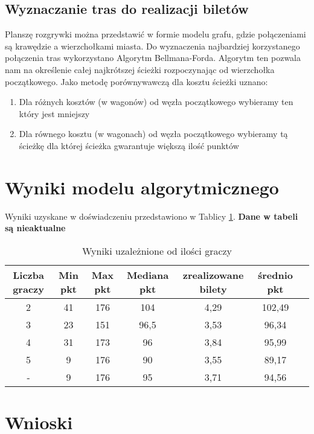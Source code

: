 \documentclass[12pt, oneside]{report}
\begin{document}
\subsection{Wyznaczanie tras do realizacji biletów}
Planszę rozgrywki można przedstawić w formie modelu grafu, gdzie połączeniami są krawędzie a wierzchołkami miasta. Do wyznaczenia najbardziej korzystanego połączenia tras wykorzystano Algorytm Bellmana-Forda. Algorytm ten pozwala nam na określenie całej najkrótszej ścieżki rozpoczynając od wierzchołka początkowego. Jako metodę porównywawczą dla kosztu ścieżki uznano:
\begin{enumerate}
	\item Dla różnych kosztów (w wagonów) od węzła początkowego wybieramy ten który jest mniejszy
	\item Dla równego kosztu (w wagonach) od węzła początkowego wybieramy tą ścieżkę dla której ścieżka gwarantuje większą ilość punktów
\end{enumerate}
\section{Wyniki modelu algorytmicznego}
Wyniki uzyskane w doświadczeniu przedstawiono w Tablicy \ref{table:algo_sizeresult}. \textbf{Dane w tabeli są nieaktualne}
\begin{table}[h]	
	\begin{center}
		\begin{tabular}{| c | c | c | c | c | c | c |} \hline
			Liczba graczy & Min pkt & Max pkt & Mediana pkt & zrealizowane bilety & średnio pkt \\ \hline
			2 & 41 & 176 & 104 & 4,29 & 102,49 \\ \hline
			3 & 23 & 151 & 96,5 & 3,53 & 96,34 \\ \hline
			4 & 31 & 173 & 96 & 3,84 &95,99 \\ \hline
			5 & 9 & 176 & 90 & 3,55 & 89,17 \\ \hline
			- & 9 & 176 & 95 & 3,71 &94,56 \\ \hline
		\end{tabular}
		\caption{Wyniki uzależnione od ilości graczy}
		\label{table:algo_sizeresult}
	\end{center}
\end{table}

\section{Wnioski}
\end{document}
